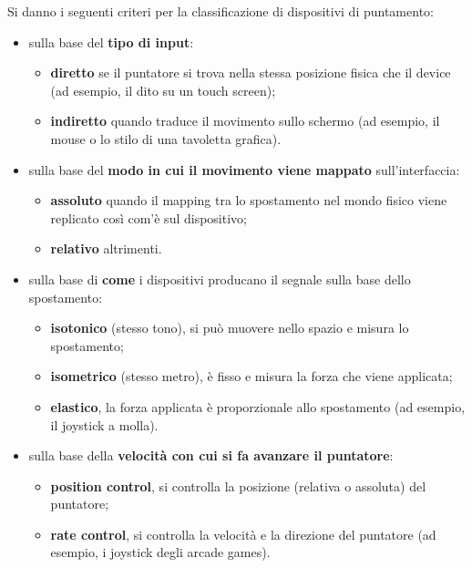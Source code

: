 Si danno i seguenti criteri per la classificazione di dispositivi di puntamento:
\begin{itemize}
	\itemsep-0.3em
	\item sulla base del \textbf{tipo di input}:
	\vspace{-3mm}
	\begin{itemize}
		\itemsep-0.3em
		\item \textbf{diretto} se il puntatore si trova nella stessa posizione fisica che il device (ad esempio, il dito su un touch screen);
		\item \textbf{indiretto} quando traduce il movimento sullo schermo (ad esempio, il mouse o lo stilo di una tavoletta grafica).
	\end{itemize}
	\item sulla base del \textbf{modo in cui il movimento viene mappato} sull'interfaccia:
	\vspace{-3mm}
	\begin{itemize}
		\itemsep-0.3em
		\item \textbf{assoluto} quando il mapping tra lo spostamento nel mondo fisico viene replicato così com'è sul dispositivo;
		\item \textbf{relativo} altrimenti.
	\end{itemize}
	\item sulla base di \textbf{come} i dispositivi producano il segnale sulla base dello spostamento:
	\vspace{-3mm}
	\begin{itemize}
		\itemsep-0.3em
		\item \textbf{isotonico} (stesso tono), si può muovere nello spazio e misura lo spostamento;
		\item \textbf{isometrico} (stesso metro), è fisso e misura la forza che viene applicata;
		\item \textbf{elastico}, la forza applicata è proporzionale allo spostamento (ad esempio, il joystick a molla).
	\end{itemize}
	\item sulla base della \textbf{velocità con cui si fa avanzare il puntatore}:
	\vspace{-3mm}
	\begin{itemize}
		\itemsep-0.3em
		\item \textbf{position control}, si controlla la posizione (relativa o assoluta) del puntatore;
		\item \textbf{rate control}, si controlla la velocità e la direzione del puntatore (ad esempio, i joystick degli arcade games).
	\end{itemize}
\end{itemize}

